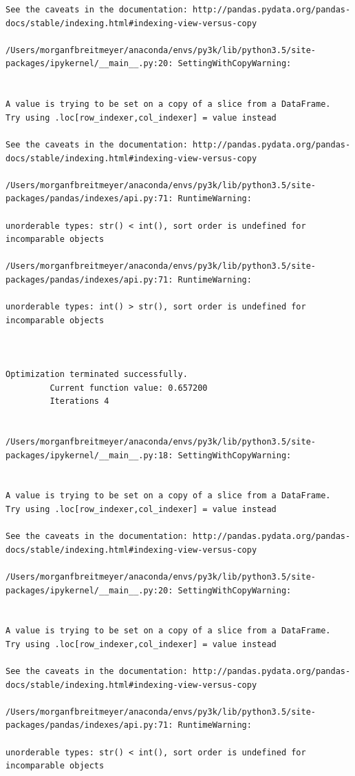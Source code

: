 \begin{lstlisting}
See the caveats in the documentation: http://pandas.pydata.org/pandas-docs/stable/indexing.html#indexing-view-versus-copy

/Users/morganfbreitmeyer/anaconda/envs/py3k/lib/python3.5/site-packages/ipykernel/__main__.py:20: SettingWithCopyWarning:


A value is trying to be set on a copy of a slice from a DataFrame.
Try using .loc[row_indexer,col_indexer] = value instead

See the caveats in the documentation: http://pandas.pydata.org/pandas-docs/stable/indexing.html#indexing-view-versus-copy

/Users/morganfbreitmeyer/anaconda/envs/py3k/lib/python3.5/site-packages/pandas/indexes/api.py:71: RuntimeWarning:

unorderable types: str() < int(), sort order is undefined for incomparable objects

/Users/morganfbreitmeyer/anaconda/envs/py3k/lib/python3.5/site-packages/pandas/indexes/api.py:71: RuntimeWarning:

unorderable types: int() > str(), sort order is undefined for incomparable objects



Optimization terminated successfully.
         Current function value: 0.657200
         Iterations 4


/Users/morganfbreitmeyer/anaconda/envs/py3k/lib/python3.5/site-packages/ipykernel/__main__.py:18: SettingWithCopyWarning:


A value is trying to be set on a copy of a slice from a DataFrame.
Try using .loc[row_indexer,col_indexer] = value instead

See the caveats in the documentation: http://pandas.pydata.org/pandas-docs/stable/indexing.html#indexing-view-versus-copy

/Users/morganfbreitmeyer/anaconda/envs/py3k/lib/python3.5/site-packages/ipykernel/__main__.py:20: SettingWithCopyWarning:


A value is trying to be set on a copy of a slice from a DataFrame.
Try using .loc[row_indexer,col_indexer] = value instead

See the caveats in the documentation: http://pandas.pydata.org/pandas-docs/stable/indexing.html#indexing-view-versus-copy

/Users/morganfbreitmeyer/anaconda/envs/py3k/lib/python3.5/site-packages/pandas/indexes/api.py:71: RuntimeWarning:

unorderable types: str() < int(), sort order is undefined for incomparable objects


\end{lstlisting}
